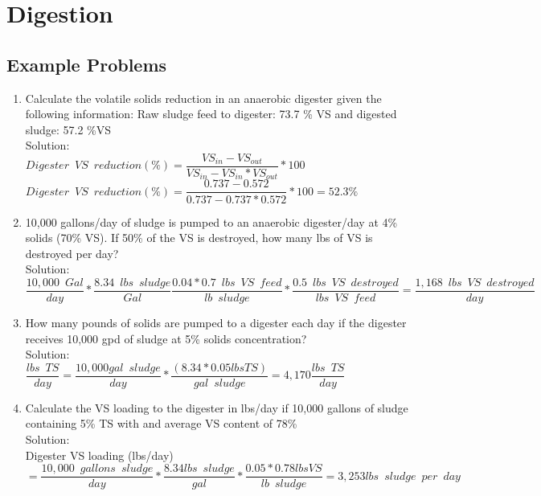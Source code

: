 \documentclass{article}
\begin{document}
\section{Digestion}

\subsection{Example Problems} 

\begin{enumerate}

\item Calculate the volatile solids reduction in an anaerobic digester given the following information: Raw sludge feed to digester: 73.7 \% VS and digested sludge: 57.2 \%VS\\

Solution:\\
\vspace{0.5cm}
$Digester \enspace VS \enspace reduction (\%)=\dfrac{VS_{in}-VS_{out}}{VS_{in}-VS_{in}*VS_{out}}*100$\\
\vspace{0.5cm}
$Digester \enspace VS \enspace reduction (\%)=\dfrac{0.737-0.572}{0.737-0.737*0.572}*100=\boxed{ 52.3\%}$\\

\item 10,000 gallons/day of sludge is pumped to an anaerobic digester/day at 4\% solids (70\% VS).  If 50\% of the VS is destroyed, how many lbs of VS is destroyed per day?\\
Solution:\\
$\dfrac{10,000 \enspace Gal}{day}*\dfrac{8.34 \enspace lbs \enspace sludge}{Gal} \dfrac{0.04*0.7 \enspace lbs \enspace VS \enspace feed}{lb \enspace sludge}*\dfrac{0.5 \enspace lbs \enspace VS \enspace destroyed}{lbs \enspace VS \enspace feed}=\boxed{\dfrac{1,168 \enspace lbs \enspace VS \enspace destroyed}{day} } $

\item How many pounds of solids are pumped to a digester each day if the digester receives 10,000 gpd of sludge at 5\% solids concentration?\\

Solution:\\

{
$
	\dfrac{lbs \enspace TS}{day}
	=
	\dfrac{10,000 gal \enspace sludge}{day}
	*
	\dfrac{(8.34*0.05 lbs TS )}{gal \enspace sludge}
	=4,170
	\dfrac{lbs \enspace TS}{day}
$
}\\

\item Calculate the VS loading to the digester in lbs/day if 10,000 gallons of sludge containing 5\% TS with and average VS content of 78\%\\
Solution:\\
Digester VS loading (lbs/day)\\$=\dfrac{10,000 \enspace gallons \enspace sludge}{day}*\dfrac{8.34lbs \enspace sludge}{gal}*\dfrac{0.05*0.78lbs VS}{lb \enspace sludge}=\boxed{3,253lbs \enspace sludge \enspace per \enspace day}$




\end{enumerate}
\end{document}

